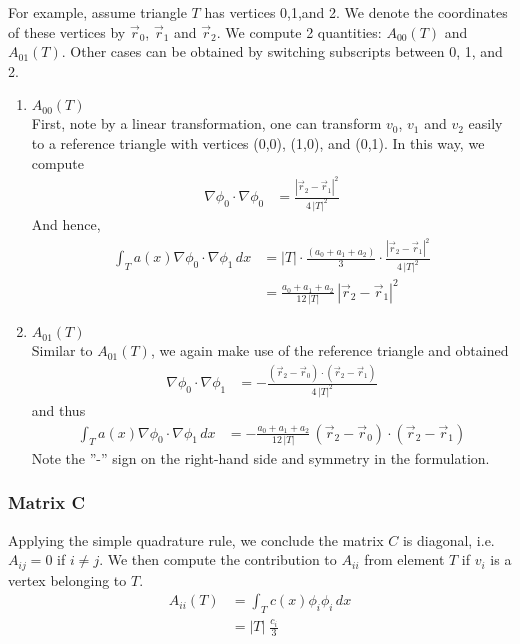 \documentclass{article}
\begin{document}
 For example, assume triangle $T$ has vertices 0,1,and 2. We denote the coordinates of these vertices by 
 $\overrightarrow{r}_0$, $\overrightarrow{r}_1$ and $\overrightarrow{r}_2$. We compute 2 quantities: $A_{00}(T)$
 and $A_{01}(T)$. Other cases can be obtained by switching subscripts between 0, 1, and 2.
 
 \begin{enumerate}
  \item $A_{00}(T)$\\
  First, note by a linear transformation, one can transform $v_0$, $v_1$ and $v_2$ easily to a reference triangle with 
  vertices (0,0), (1,0), and (0,1). In this way, we compute
  \begin{align}
   \nabla \phi_0 \cdot \nabla \phi_0 
   &= \frac{\left| \overrightarrow{r}_2 - \overrightarrow{r}_1 \right|^2}
	   {4\,|T|^2}
  \end{align}
  And hence,
  \begin{align}
   \int_T a(x) \nabla \phi_0 \cdot \nabla \phi_1 \, dx 
   &= |T| \cdot \frac{\left( a_0 + a_1 + a_2 \right)}{3} 
	      \cdot \frac{\left| \overrightarrow{r}_2 - \overrightarrow{r}_1 \right|^2}{4\,|T|^2} \\
   &= \frac{a_0 + a_1 + a_2}{12 \, |T|}\,\left| \overrightarrow{r}_2 - \overrightarrow{r}_1 \right|^2
  \end{align}


  \item $A_{01}(T)$\\
  Similar to $A_{01}(T)$, we again make use of the reference triangle and obtained
  \begin{align}
   \nabla \phi_0 \cdot \nabla \phi_1 
   & = -\frac{      \left( \overrightarrow{r}_2 - \overrightarrow{r}_0 \right) 
              \cdot \left( \overrightarrow{r}_2 - \overrightarrow{r}_1 \right)}
             {4\,|T|^2}
  \end{align}
  and thus
  \begin{align}
   \int_T a(x) \nabla \phi_0 \cdot \nabla \phi_1 \, dx
   &= - \frac{a_0 + a_1 + a_2}{12 \, |T|}
        \,      \left( \overrightarrow{r}_2 - \overrightarrow{r}_0 \right) 
          \cdot \left( \overrightarrow{r}_2 - \overrightarrow{r}_1 \right)
  \end{align}
  Note the ''-'' sign on the right-hand side and symmetry in the formulation.

 \end{enumerate}

 \subsubsection{Matrix C}
 Applying the simple quadrature rule, we conclude the matrix $C$ is diagonal, i.e. $A_{ij}=0$ if $i \neq j$.
 We then compute the contribution to $A_{ii}$ from element $T$ if $v_i$ is a vertex belonging to $T$. 
 \begin{align}
  A_{ii}(T) &= \int_T c(x) \phi_i \phi_i \, dx\\
            &= |T| \; \frac{c_i}{3}
 \end{align}
\end{document}
